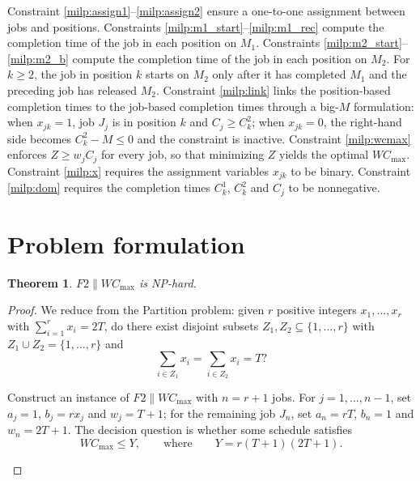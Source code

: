 \documentclass[12pt]{article}
\newtheorem{theorem}{Theorem}[section]
\let\origsection\section
\renewcommand{\section}{\FloatBarrier\origsection}
\begin{document}
\begin{sloppypar}
Constraint \cref{milp:assign1}--\cref{milp:assign2} ensure a one-to-one assignment between jobs and positions.
Constraints \cref{milp:m1_start}--\cref{milp:m1_rec} compute the completion time of the job in each position on $M_1$.
Constraints \cref{milp:m2_start}--\cref{milp:m2_b} compute the completion time of the job in each position on $M_2$.
For $k \ge 2$, the job in position $k$ starts on $M_2$ only after it has completed $M_1$ and the preceding job has released $M_2$.
Constraint \cref{milp:link} links the position-based completion times to the job-based completion times through a big-$M$ formulation:
when $x_{jk} = 1$, job $J_j$ is in position $k$ and $C_j \ge C_k^2$;
when $x_{jk} = 0$, the right-hand side becomes $C_k^2 - M \le 0$ and the constraint is inactive.
Constraint \cref{milp:wcmax} enforces $Z \ge w_j C_j$ for every job, so that minimizing $Z$ yields the optimal $W C_{\max}$.
Constraint \cref{milp:x} requires the assignment variables $x_{jk}$ to be binary.
Constraint \cref{milp:dom} requires the completion times $C_k^1$, $C_k^2$ and $C_j$ to be nonnegative.

\section{Problem formulation}
\label{sec:formulation}
\begin{theorem}\label{thm:nphard}
    $F2 \parallel W C_{\max}$ is NP-hard.
\end{theorem}
\begin{proof}
We reduce from the Partition problem: given $r$ positive integers $x_1,\dots,x_r$ with
$\sum_{i=1}^{r}x_i=2T$, do there exist disjoint subsets $Z_1,Z_2\subseteq\{1,\dots,r\}$ with
$Z_1\cup Z_2=\{1,\dots,r\}$ and
\[
\sum_{i\in Z_1}x_i=\sum_{i\in Z_2}x_i=T?
\]

Construct an instance of $F2 \parallel W C_{\max}$ with $n=r+1$ jobs. For $j=1,\dots,n-1$, set
$a_j=1$, $b_j=rx_j$ and $w_j=T+1$; for the remaining job $J_n$, set $a_n=rT$, $b_n=1$ and
$w_n=2T+1$. The decision question is whether some schedule satisfies
\[
W C_{\max}\le Y, \qquad\text{where}\qquad Y=r(T+1)(2T+1).
\]
\begin{center}
\end{center}
\end{proof}
\end{sloppypar}
\end{document}
